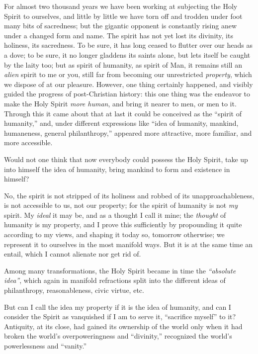 \documentclass[12pt,a4paper]{book}
\begin{document}
For almost two thousand years we have been working at subjecting the Holy 
Spirit to ourselves, and little by little we have torn off and trodden under 
foot many bits of sacredness; but the gigantic opponent is constantly rising 
anew under a changed form and name. The spirit has not yet lost its divinity, 
its holiness, its sacredness. To be sure, it has long ceased to flutter over 
our heads as a dove; to be sure, it no longer gladdens its saints alone, but 
lets itself be caught by the laity too; but as spirit of humanity, as spirit 
of Man, it remains still an \textit{alien} spirit to me or you, still far from 
becoming our unrestricted \textit{property}, which we dispose of at our 
pleasure. However, one thing certainly happened, and visibly guided the 
progress of post-Christian history: this one thing was the endeavor to make 
the Holy Spirit \textit{more human}, and bring it nearer to men, or men to it. 
Through this it came about that at last it could be conceived as the ``spirit 
of humanity,'' and, under different expressions like ``idea of humanity, 
mankind, humaneness, general philanthropy,'' appeared more attractive, more 
familiar, and more accessible.

Would not one think that now everybody could possess the Holy Spirit, take up 
into himself the idea of humanity, bring mankind to form and existence in 
himself?

No, the spirit is not stripped of its holiness and robbed of its 
unapproachableness, is not accessible to us, not our property; for the spirit 
of humanity is not \textit{my} spirit. My \textit{ideal} it may be, and as a 
thought I call it mine; the \textit{thought} of humanity is my property, and I 
prove this sufficiently by propounding it quite according to my views, and 
shaping it today so, tomorrow otherwise; we represent it to ourselves in the 
most manifold ways. But it is at the same time an entail, which I cannot 
alienate nor get rid of.

Among many transformations, the Holy Spirit became in time the 
\textit{``absolute idea''}, which again in manifold refractions split into 
the different ideas of philanthropy, reasonableness, civic virtue, etc.

But can I call the idea my property if it is the idea of humanity, and can I 
consider the Spirit as vanquished if I am to serve it, ``sacrifice myself'' 
to it? Antiquity, at its close, had gained its ownership of the world only 
when it had broken the world's overpoweringness and ``divinity,'' recognized 
the world's powerlessness and ``vanity.''
\end{document}
